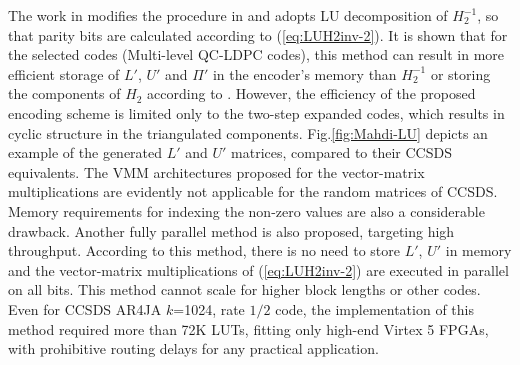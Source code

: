 The work in \cite{Mahdi2014} modifies the procedure in \cite{Jia-ningSu2005} and adopts LU decomposition of $H_{2}^{-1}$, so that parity bits are calculated according to (\ref{eq:LUH2inv-2}). It is shown that for the selected codes (Multi-level QC-LDPC codes), this method can result in more efficient storage of $L'$, $U'$ and $\Pi'$ in the encoder's memory than $H_{2}^{-1}$ or storing the components of $H_{2}$ according to \cite{Chia-YuLin2008}. However, the efficiency of the proposed encoding scheme is limited only to the two-step expanded codes, which results in cyclic structure in the triangulated components. Fig.\ref{fig:Mahdi-LU} depicts an example of the generated $L'$ and $U'$ matrices, compared to their CCSDS equivalents. The VMM architectures proposed for the vector-matrix multiplications are evidently not applicable for the random matrices of CCSDS. Memory requirements for indexing the non-zero values are also a considerable drawback. Another fully parallel method is also proposed, targeting high throughput. According to this method, there is no need to store $L'$, $U'$ in memory and the vector-matrix multiplications of (\ref{eq:LUH2inv-2}) are executed in parallel on all bits. This method cannot scale for higher block lengths or other codes. Even for CCSDS AR4JA $k$=1024, rate $1/2$ code, the implementation of this method required more than 72K LUTs, fitting only high-end Virtex 5 FPGAs, with prohibitive routing delays for any practical application.\par
